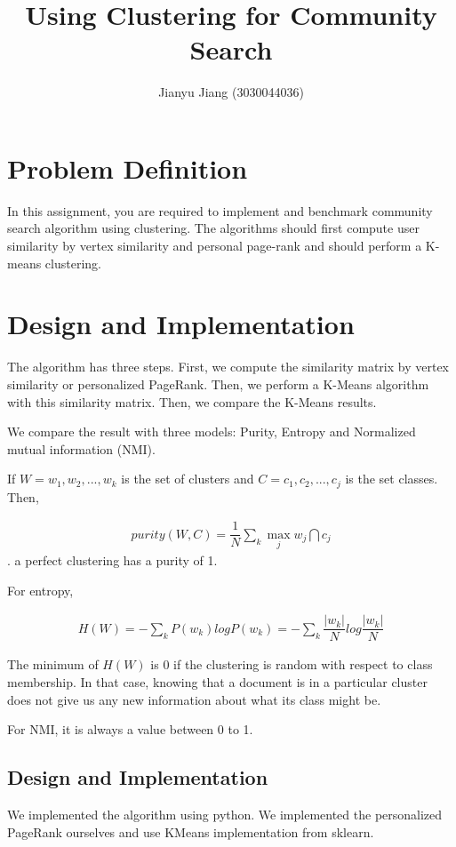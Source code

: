 \documentclass{article}
\title{Using Clustering for Community Search}
\author{Jianyu Jiang (3030044036)}
\begin{document}
\maketitle
\section{Problem Definition}
In this assignment, you are required to implement and benchmark community search
algorithm using clustering.
The algorithms should first compute user similarity by
vertex similarity and personal page-rank
and should perform a K-means clustering.

\section{Design and Implementation}
The algorithm has three steps. First, we compute the similarity matrix
by vertex similarity or personalized PageRank. Then, we perform
a K-Means algorithm with this similarity matrix. Then, we compare
the K-Means results.

We compare the result with three models: Purity, Entropy
and Normalized mutual information (NMI).

If $W = {w_1, w_2, ..., w_k}$ is the set of clusters and
$C = {c_1, c_2, ..., c_j}$ is the set classes. Then,

\begin{align}
  purity(W, C) = \dfrac{1}{N}\sum\limits_{k}\max_j{w_j \bigcap c_j}
\end{align}.
a perfect clustering has a purity of 1.

For entropy,

\begin{align}
  H(W) = -\sum\limits_kP(w_k)logP(w_k) = -\sum\limits_k\dfrac{|w_k|}{N}log\dfrac{|w_k|}{N}
\end{align}

The minimum of $H(W)$ is 0 if the clustering is random with respect to class
membership. In that case, knowing that a document
is in a particular cluster does not give us any new information
about what its class might be.

For NMI, it is always a value between 0 to 1.


\subsection{Design and Implementation}
We implemented the algorithm using python. We implemented
the personalized PageRank ourselves and use KMeans implementation
from sklearn.
\end{document}

